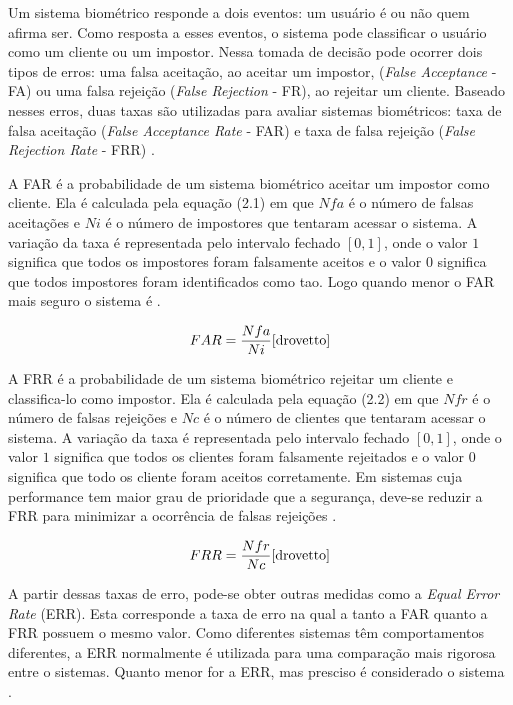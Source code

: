 Um sistema biométrico responde a dois eventos: um usuário é ou não quem afirma ser. Como resposta a esses eventos, o sistema pode classificar o usuário como um cliente ou um impostor. Nessa tomada de decisão pode ocorrer dois tipos de erros: uma falsa aceitação, ao aceitar um impostor, (\textit{False Acceptance} - FA) ou uma falsa rejeição (\textit{False Rejection} - FR), ao rejeitar um cliente. Baseado nesses erros, duas taxas são utilizadas para avaliar sistemas biométricos: taxa de falsa aceitação (\textit{False Acceptance Rate} - FAR) e taxa de falsa rejeição (\textit{False Rejection Rate} - FRR) \cite{drovetto}.

A FAR é a probabilidade de um sistema biométrico aceitar um impostor como cliente. Ela é calculada pela equação (2.1) em que $\displaystyle Nfa$ é o número de falsas aceitações e $\displaystyle Ni$ é o número de impostores que tentaram acessar o sistema. A variação da taxa é representada pelo intervalo fechado $\displaystyle [0,1]$, onde o valor $\displaystyle 1$ significa que todos os impostores foram falsamente aceitos e o valor $\displaystyle 0$ significa que todos impostores foram identificados como tao. Logo quando menor o FAR mais seguro o sistema é \cite{drovetto}.

	\begin{equation}
		FAR = \frac{Nfa}{Ni} \cite{drovetto}
	\end{equation} 

A FRR é a probabilidade de um sistema biométrico rejeitar um cliente e classifica-lo como impostor. Ela é calculada pela equação (2.2) em que $\displaystyle Nfr$ é o número de falsas rejeições e $\displaystyle Nc$ é o número de clientes que tentaram acessar o sistema. A variação da taxa é representada pelo intervalo fechado $\displaystyle [0,1]$, onde o valor $\displaystyle 1$ significa que todos os clientes foram falsamente rejeitados e o valor $\displaystyle 0$ significa que todo os cliente foram aceitos corretamente. Em sistemas cuja performance tem maior grau de prioridade que a segurança, deve-se reduzir a FRR para minimizar a ocorrência de falsas rejeições \cite{drovetto}.

	\begin{equation}
		FRR = \frac{Nfr}{Nc} \cite{drovetto}
	\end{equation} 

A partir dessas taxas de erro, pode-se obter outras medidas como a \textit{Equal Error Rate} (ERR). Esta corresponde a taxa de erro na qual a tanto a FAR quanto a FRR possuem o mesmo valor. Como diferentes sistemas têm comportamentos diferentes, a ERR normalmente é utilizada para uma comparação mais rigorosa entre o sistemas. Quanto menor for a ERR, mas presciso é considerado o sistema \cite{drovetto}.
